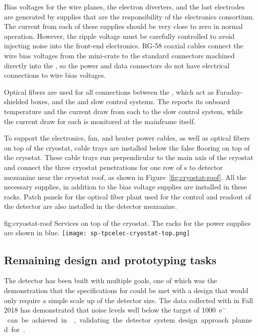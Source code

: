 Bias voltages for the  wire planes, the electron diverters, 
and the last  electrodes are generated by supplies that are 
the responsibility of the  electronics consortium.  The 
current from each of these supplies should be very close to zero in 
normal operation. However, the ripple voltage must be carefully 
controlled to avoid injecting noise into the front-end electronics.  
RG-58 coaxial cables connect the wire bias voltages from the mini-crate 
to the standard  connectors machined directly into the 
 \fdth, so the  power and data connectors do not 
have electrical connections to wire bias voltages.

Optical fibers are used for all connections between the , 
which act as Faraday-shielded boxes, and the  and slow 
control systems.  The  reports its onboard temperature 
and the current draw from each  to the slow control system, 
while the current draw for each  is monitored at the 
mainframe itself.

To support the electronics, fan, and heater power cables, as well 
as optical fibers on top of the cryostat, cable trays are installed
below the false flooring on top of the cryostat. These cable trays
run perpendicular to the main axis of the cryostat and connect the
three cryostat penetrations for one row of s to detector
mezzanine near the cryostat roof, as shown in Figure~\ref{fig:cryostat-roof}.
All the necessary  supplies, in addition to the bias
voltage supplies are installed in these racks. Patch panels for
the optical fiber plant used for the control and readout of the
detector are also installed in the detector mezzanine.

\begin{dunefigure}
{fig:cryostat-roof}
{Services on top of the cryostat. The racks for the  power supplies are shown in blue.}
\texttt{[image: sp-tpcelec-cryostat-top.png]}
\end{dunefigure}

\subsection{Remaining design and prototyping tasks}
\label{sec:fdsp-tpcelec-overview-remaining}

The  detector has been built with multiple
goals, one of which was the demonstration that the specifications
for  could be met with a design that would only require a simple
scale up of the detector size. The data collected with 
in Fall 2018 has demonstrated that noise levels well below the target
of \SI{1000}{e$^-$} can be achieved in \lar, validating the
detector system design approach planned for .

